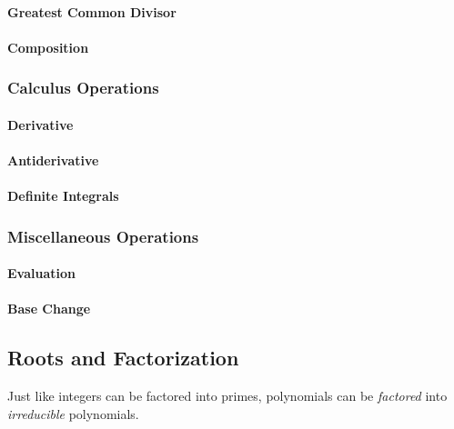 \paragraph{Greatest Common Divisor}




\paragraph{Composition}

\subsubsection{Calculus Operations}

\paragraph{Derivative}

\paragraph{Antiderivative}

\paragraph{Definite Integrals}


\subsubsection{Miscellaneous Operations}

\paragraph{Evaluation}

\paragraph{Base Change}



\subsection{Roots and Factorization}
Just like integers can be factored into primes, polynomials can be \emph{factored} into \emph{irreducible} polynomials.

